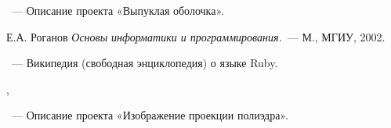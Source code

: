 \begin{thebibliography}{}

~---
Описание проекта «Выпуклая оболочка».

Е.А. Роганов
{\em Основы информатики и программирования.}~---
М., МГИУ, 2002.

~---
Википедия (свободная энциклопедия) о языке Ruby.

, 

~---
Описание проекта «Изображение проекции полиэдра».

\end{thebibliography}
